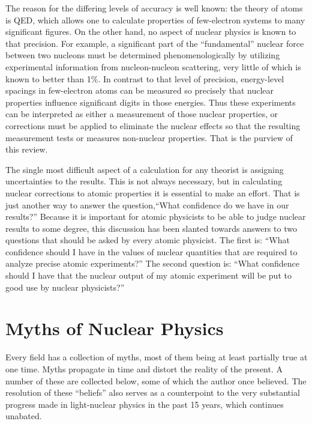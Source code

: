 \documentclass{svmult}
\begin{document}
The reason for the differing levels of accuracy is well known: the theory of
atoms is QED, which allows one to calculate properties of few-electron systems
to many significant figures\cite{review}. On the other hand, no aspect of
nuclear physics is known to that precision.  For example, a significant part of
the ``fundamental'' nuclear force between two nucleons must be determined
phenomenologically by utilizing experimental information from nucleon-nucleon
scattering\cite{2gen}, very little of which is known to better than 1\%. In
contrast to that level of precision, energy-level spacings in few-electron atoms
can be measured so precisely that nuclear properties influence significant
digits in those energies\cite{d-p}.  Thus these experiments can be interpreted
as either a measurement of those nuclear properties, or corrections must be
applied to eliminate the nuclear effects so that the resulting measurement tests
or measures non-nuclear properties. That is the purview of this review.

The single most difficult aspect of a calculation for any theorist is assigning
uncertainties to the results.  This is not always necessary, but in calculating
nuclear corrections to atomic properties it is essential to make an effort. That
is just another way to answer the question,``What confidence do we have in our
results?'' Because it is important for atomic physicists to be able to judge
nuclear results to some degree, this discussion has been slanted towards answers
to two questions that should be asked by every atomic physicist. The first is:
``What confidence should I have in the values of nuclear quantities that are
required to analyze precise atomic experiments?'' The second question is: ``What
confidence should I have that the nuclear output of my atomic experiment will be
put to good use by nuclear physicists?''

\section{Myths of Nuclear Physics}

Every field has a collection of myths, most of them being at least partially
true at one time.  Myths propagate in time and distort the reality of the
present.  A number of these are collected below, some of which the author once
believed. The resolution of these ``beliefs'' also serves as a counterpoint to
the very substantial progress made in light-nuclear physics in the past 15
years, which continues unabated.
\end{document}
